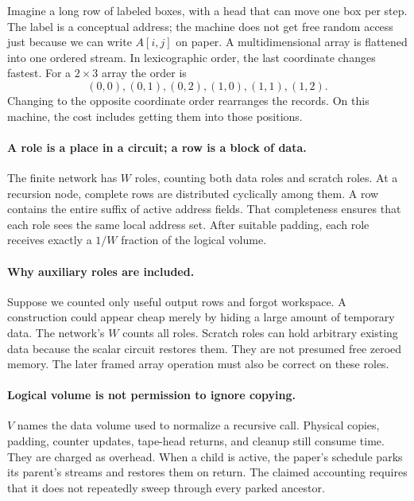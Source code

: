 
Imagine a long row of labeled boxes, with a head that can move one box per
step. The label is a conceptual address; the machine does not get free random
access just because we can write $A[i,j]$ on paper. A multidimensional array
is flattened into one ordered stream. In lexicographic order, the last
coordinate changes fastest. For a $2\times3$ array the order is
\[
 (0,0),(0,1),(0,2),(1,0),(1,1),(1,2).
\]
Changing to the opposite coordinate order rearranges the records. On this
machine, the cost includes getting them into those positions.

\paragraph{A role is a place in a circuit; a row is a block of data.}
The finite network has $W$ roles, counting both data roles and scratch roles.
At a recursion node, complete rows are distributed cyclically among them.
A row contains the entire suffix of active address fields. That completeness
ensures that each role sees the same local address set. After suitable padding,
each role receives exactly a $1/W$ fraction of the logical volume.


\paragraph{Why auxiliary roles are included.}
Suppose we counted only useful output rows and forgot workspace. A construction
could appear cheap merely by hiding a large amount of temporary data. The
network's $W$ counts all roles. Scratch roles can hold arbitrary existing data
because the scalar circuit restores them. They are not presumed free zeroed
memory. The later framed array operation must also be correct on these roles.

\paragraph{Logical volume is not permission to ignore copying.}
$V$ names the data volume used to normalize a recursive call. Physical copies,
padding, counter updates, tape-head returns, and cleanup still consume time.
They are charged as overhead. When a child is active, the paper's schedule
parks its parent's streams and restores them on return. The claimed accounting
requires that it does not repeatedly sweep through every parked ancestor.

